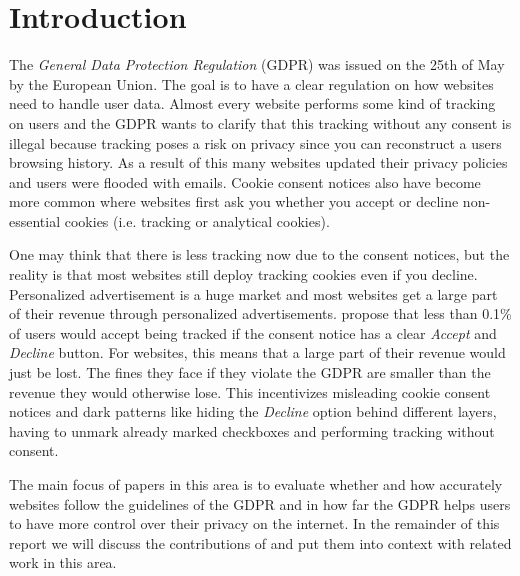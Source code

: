 \section{Introduction}
\label{sec:intro}

The \emph{General Data Protection Regulation} (GDPR) was issued on the 25th of May by the European Union. The goal is to
have a clear regulation on how websites need to handle user data. Almost every website performs some kind of tracking on
users and the GDPR wants to clarify that this tracking without any consent is illegal because tracking poses a risk on
privacy since you can reconstruct a users browsing history. As a result of this many
websites updated their privacy policies and users were flooded with emails. Cookie consent notices also have become more
common where websites first ask you whether you accept or decline non-essential cookies (i.e. tracking or analytical
cookies).

One may think that there is less tracking now due to the consent notices, but the reality is that most websites still
deploy tracking cookies even if you decline. Personalized advertisement is a huge market and most websites get a large
part of their revenue through personalized advertisements.  propose that less than 0.1\% of users
would accept being tracked if the consent notice has a clear \emph{Accept} and \emph{Decline} button. For websites, this
means that a large part of their revenue would just be lost. The fines they face if they violate the GDPR are smaller
than the revenue they would otherwise lose. This incentivizes misleading cookie consent notices and dark patterns like
hiding the \emph{Decline} option behind different layers, having to unmark already marked checkboxes and performing
tracking without consent.

The main focus of papers in this area is to evaluate whether and how accurately websites follow the guidelines of the
GDPR and in how far the GDPR helps users to have more control over their privacy on the internet.
In the remainder of this report we will discuss the contributions of  and put them into context
with related work in this area.


